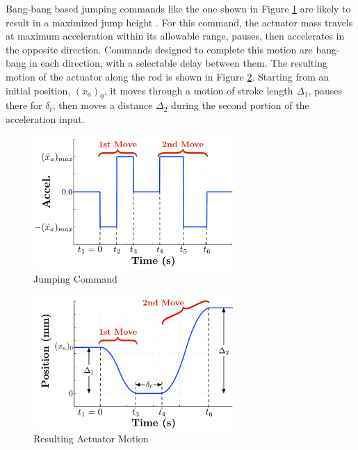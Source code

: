 \documentclass[letterpaper, 10 pt, conference]{ieeeconf}  %
\begin{document}
Bang-bang based jumping commands like the one shown in Figure \ref{fig:sim_command} are likely to result in a maximized jump height \cite{Vaughan2013}. For this command, the actuator mass travels at maximum acceleration within its allowable range, pauses, then accelerates in the opposite direction. Commands designed to complete this motion are bang-bang in each direction, with a selectable delay between them. The resulting motion of the actuator along the rod is shown in Figure \ref{fig:command_act_motion}. Starting from an initial position, $(x_a)_0$, it moves through a motion of stroke length $\Delta_1$, pauses there for $\delta_t$, then moves a distance $\Delta_2$ during the second portion of the acceleration input.

%
\begin{figure}[tb]
\begin{center}
\includegraphics[width = 3in]{figures/command_form}  
\caption{Jumping Command}
\label{fig:sim_command}
\end{center}
\end{figure}
%
%
\begin{figure}[tb]
\begin{center}
\includegraphics[width = 3in]{figures/jumping_command_position}  
\caption{Resulting Actuator Motion}
\label{fig:command_act_motion}
\end{center}
\end{figure}
%
\end{document}
